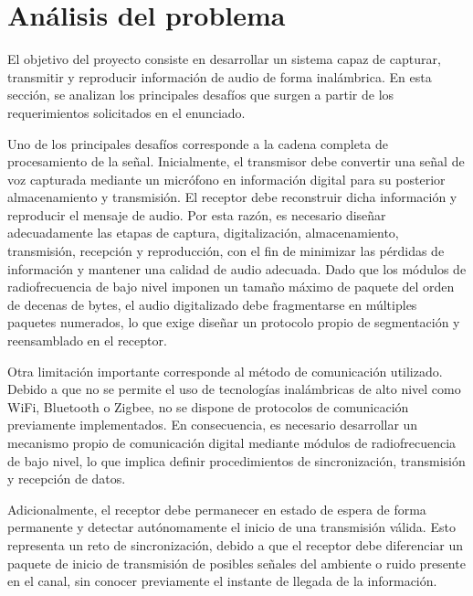 

\section{Análisis del problema}

El objetivo del proyecto consiste en desarrollar un sistema capaz de capturar, transmitir y reproducir información de audio de forma inalámbrica.
En esta sección, se analizan los principales desafíos que surgen a partir de los requerimientos solicitados en el enunciado.

Uno de los principales desafíos corresponde a la cadena completa de procesamiento de la señal.
Inicialmente, el transmisor debe convertir una señal de voz capturada mediante un micrófono en información digital para su posterior almacenamiento y transmisión.
El receptor debe reconstruir dicha información y reproducir el mensaje de audio.
Por esta razón, es necesario diseñar adecuadamente las etapas de captura, digitalización, almacenamiento, transmisión, recepción y reproducción, con el fin de minimizar las pérdidas de información y mantener una calidad de audio adecuada.
Dado que los módulos de radiofrecuencia de bajo nivel imponen un tamaño máximo de paquete del orden de decenas de bytes, el audio digitalizado debe fragmentarse en múltiples paquetes numerados, lo que exige diseñar un protocolo propio de segmentación y reensamblado en el receptor.

Otra limitación importante corresponde al método de comunicación utilizado.
Debido a que no se permite el uso de tecnologías inalámbricas de alto nivel como WiFi, Bluetooth o Zigbee, no se dispone de protocolos de comunicación previamente implementados.
En consecuencia, es necesario desarrollar un mecanismo propio de comunicación digital mediante módulos de radiofrecuencia de bajo nivel, lo que implica definir procedimientos de sincronización, transmisión y recepción de datos.

Adicionalmente, el receptor debe permanecer en estado de espera de forma permanente y detectar autónomamente el inicio de una transmisión válida.
Esto representa un reto de sincronización, debido a que el receptor debe diferenciar un paquete de inicio de transmisión de posibles señales del ambiente o ruido presente en el canal, sin conocer previamente el instante de llegada de la información.

